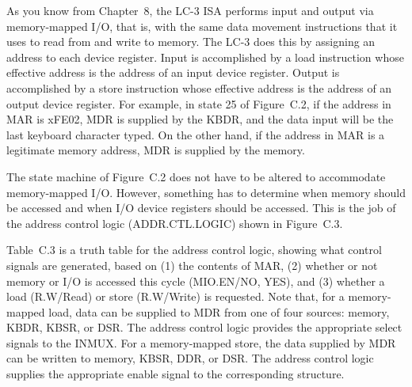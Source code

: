 \documentclass{patt}
\begin{document}
As you know from Chapter~8, the LC-3 ISA performs input and output
via memory-mapped I/O, that is, with the same data movement
instructions that it uses to read from and write to memory.  The
LC-3 does this by assigning an address to each device register.
Input is accomplished by a load instruction whose effective
address is the address of an input device register. Output is
accomplished by a store instruction whose effective address is the
address of an output device register. For example, in state 25 of
Figure~C.2, if the address in MAR is xFE02,\vadjust{\pagebreak}
MDR is supplied by the KBDR, and the data input will be the last
keyboard \nobreak character typed.  On the other hand, if the
address in MAR is a legitimate memory address, MDR is supplied by
the memory.

The state machine of Figure~C.2 does not have to be altered to
accommodate memory-mapped I/O.  However, something has to determine
when memory should be accessed and when I/O device registers should be
accessed.  This is the job of the address control logic (ADDR.CTL.LOGIC)
shown in Figure~C.3.

Table~C.3 is a truth table for the address control logic, showing what
control signals are generated, based on (1) the contents of MAR, (2)
whether or not memory or I/O is accessed this cycle (MIO.EN/NO, YES),
and (3) whether a load (R.W/Read) or store (R.W/Write) is requested.
Note that, for a memory-mapped load, data can be supplied to MDR from one
of four sources: memory, KBDR, KBSR, or DSR.  The address control
logic provides the appropriate select signals to the INMUX.  For a
memory-mapped store, the data supplied by MDR can be written to
memory, KBSR, DDR, or DSR.  The address control logic supplies the
appropriate enable signal to the corresponding structure.
\end{document}
